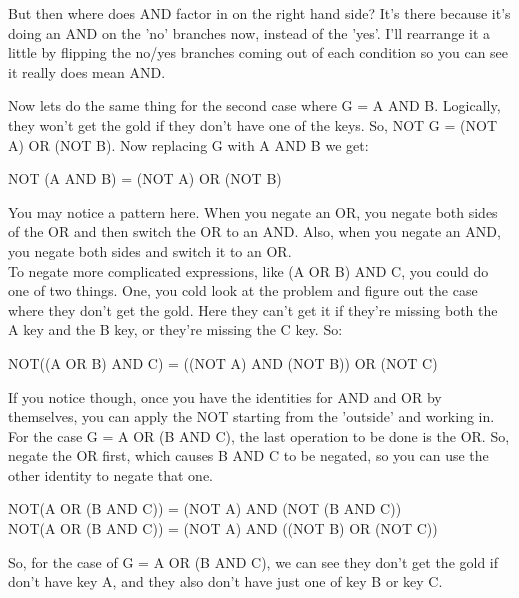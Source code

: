 \begin{center} \end{center}

But then where does AND factor in on the right hand side? It's there because it's doing an AND on the 'no' branches now, instead of the 'yes'. I'll rearrange it a little by flipping the no/yes branches coming out of each condition so you can see it really does mean AND.

\begin{center} \end{center}

Now lets do the same thing for the second case where G = A AND B. Logically, they won't get the gold if they don't have one of the keys. So, NOT G = (NOT A) OR (NOT B). Now replacing G with A AND B we get:

\begin{center}
	NOT (A AND B) = (NOT A) OR (NOT B)
\end{center}

\begin{center} \end{center}

You may notice a pattern here. When you negate an OR, you negate both sides of the OR and then switch the OR to an AND. Also, when you negate an AND, you negate both sides and switch it to an OR.\\

To negate more complicated expressions, like (A OR B) AND C, you could do one of two things. One, you cold look at the problem and figure out the case where they don't get the gold. Here they can't get it if they're missing both the A key and the B key, or they're missing the C key. So:

\begin{center}
	NOT((A OR B) AND C) = ((NOT A) AND (NOT B)) OR (NOT C)
\end{center}

If you notice though, once you have the identities for AND and OR by themselves, you can apply the NOT starting from the 'outside' and working in. For the case G = A OR (B AND C), the last operation to be done is the OR. So, negate the OR first, which causes B AND C to be negated, so you can use the other identity to negate that one.

\begin{center}
	NOT(A OR (B AND C)) = (NOT A) AND (NOT (B AND C))\\
	
	NOT(A OR (B AND C)) = (NOT A) AND ((NOT B) OR (NOT C))
\end{center}

So, for the case of G = A OR (B AND C), we can see they don't get the gold if don't have key A, and they also don't have just one of key B or key C.\\